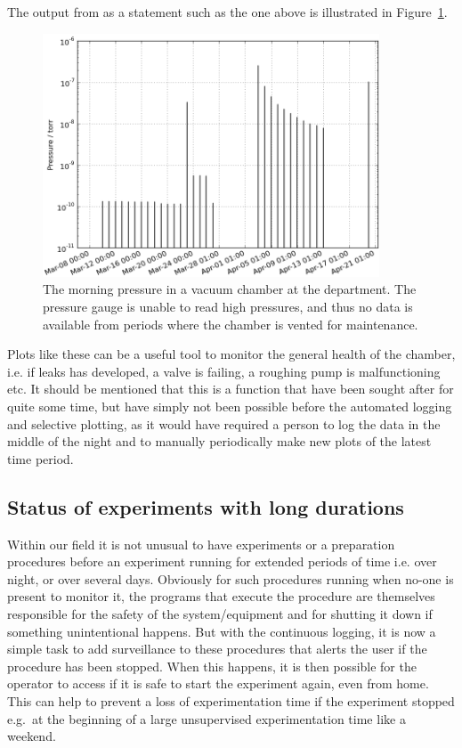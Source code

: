 The output from as a statement such as the one above is illustrated in
Figure~\ref{fig:morning_pressure}.
\begin{figure}
 \begin{center}
 \includegraphics[width=10cm]{morning_pressure.png}
 \caption{ The morning pressure in a vacuum chamber at the department. The
   pressure gauge is unable to read high pressures, and thus no data is
   available from periods where the chamber is vented for maintenance.
   \label{fig:morning_pressure}
 } 
 \end{center}
\end{figure}
Plots like these can be a useful tool to monitor the general health of
the chamber, i.e. if leaks has developed, a valve is failing, a
roughing pump is malfunctioning etc. It should be mentioned that this
is a function that have been sought after for quite some time, but
have simply not been possible before the automated logging and
selective plotting, as it would have required a person to log the data
in the middle of the night and to manually periodically make new plots
of the latest time period.

\subsection{Status of experiments with long durations}

Within our field it is not unusual to have experiments or a
preparation procedures before an experiment running for extended
periods of time i.e. over night, or over several days. Obviously for
such procedures running when no-one is present to monitor it, the
programs that execute the procedure are themselves responsible for the
safety of the system/equipment and for shutting it down if something
unintentional happens. But with the continuous logging, it is now a
simple task to add surveillance to these procedures that alerts the
user if the procedure has been stopped. When this happens, it is then
possible for the operator to access if it is safe to start the
experiment again, even from home. This can help to prevent a loss of
experimentation time if the experiment stopped e.g.\ at the beginning
of a large unsupervised experimentation time like a weekend.

